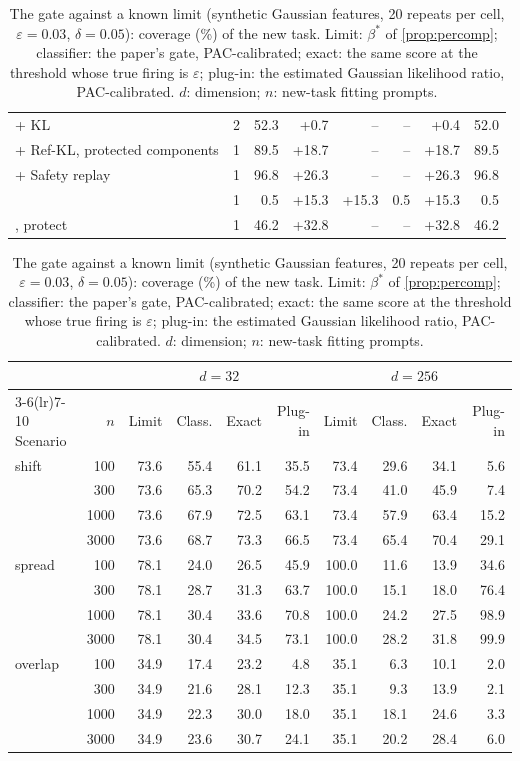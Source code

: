 \begin{table}[t]
\begin{minipage}[t]{0.535\linewidth}
\begin{tabular}{l r rr rr rr}
+ KL & 2 & 52.3 & +0.7 & -- & -- & +0.4 & 52.0 \\
+ Ref-KL, protected components & 1 & 89.5 & +18.7 & -- & -- & +18.7 & 89.5 \\
+ Safety replay & 1 & 96.8 & +26.3 & -- & -- & +26.3 & 96.8 \\
\methodp{} & 1 & 0.5 & +15.3 & +15.3 & 0.5 & +15.3 & 0.5 \\
\methodp{}, protect & 1 & 46.2 & +32.8 & -- & -- & +32.8 & 46.2 \\
\bottomrule
\end{tabular}
\end{minipage}\hfill
\begin{minipage}[t]{0.445\linewidth}
\centering
\setlength{\tabcolsep}{1.6pt}
\caption{The gate against a known limit (synthetic Gaussian features, 20 repeats per cell, $\varepsilon=0.03$,
$\delta=0.05$): coverage (\%) of the new task. Limit: $\beta^\ast$ of \cref{prop:percomp}; classifier: the paper's
gate, PAC-calibrated; exact: the same score at the threshold whose true firing is $\varepsilon$; plug-in: the
estimated Gaussian likelihood ratio, PAC-calibrated. $d$: dimension; $n$: new-task fitting prompts.}
\label{tab:npgap}
\begin{tabular}{l r rrrr rrrr}
\toprule
 & & \multicolumn{4}{c}{$d=32$} & \multicolumn{4}{c}{$d=256$} \\
\cmidrule(lr){3-6}\cmidrule(lr){7-10}
Scenario & $n$ & Limit & Class. & Exact & Plug-in & Limit & Class. & Exact & Plug-in \\
\midrule
shift & 100 & 73.6 & 55.4 & 61.1 & 35.5 & 73.4 & 29.6 & 34.1 & 5.6 \\
 & 300 & 73.6 & 65.3 & 70.2 & 54.2 & 73.4 & 41.0 & 45.9 & 7.4 \\
 & 1000 & 73.6 & 67.9 & 72.5 & 63.1 & 73.4 & 57.9 & 63.4 & 15.2 \\
 & 3000 & 73.6 & 68.7 & 73.3 & 66.5 & 73.4 & 65.4 & 70.4 & 29.1 \\
\midrule
spread & 100 & 78.1 & 24.0 & 26.5 & 45.9 & 100.0 & 11.6 & 13.9 & 34.6 \\
 & 300 & 78.1 & 28.7 & 31.3 & 63.7 & 100.0 & 15.1 & 18.0 & 76.4 \\
 & 1000 & 78.1 & 30.4 & 33.6 & 70.8 & 100.0 & 24.2 & 27.5 & 98.9 \\
 & 3000 & 78.1 & 30.4 & 34.5 & 73.1 & 100.0 & 28.2 & 31.8 & 99.9 \\
\midrule
overlap & 100 & 34.9 & 17.4 & 23.2 & 4.8 & 35.1 & 6.3 & 10.1 & 2.0 \\
 & 300 & 34.9 & 21.6 & 28.1 & 12.3 & 35.1 & 9.3 & 13.9 & 2.1 \\
 & 1000 & 34.9 & 22.3 & 30.0 & 18.0 & 35.1 & 18.1 & 24.6 & 3.3 \\
 & 3000 & 34.9 & 23.6 & 30.7 & 24.1 & 35.1 & 20.2 & 28.4 & 6.0 \\
\bottomrule
\end{tabular}
\end{minipage}
\end{table}

